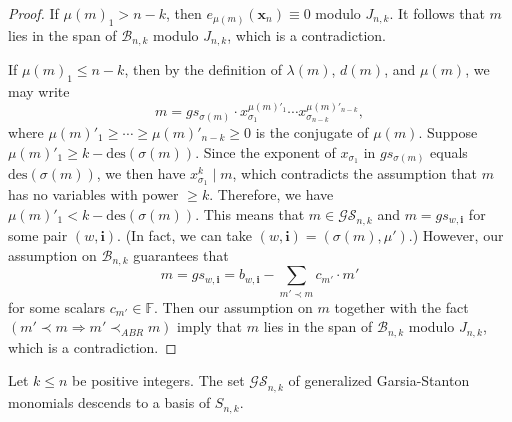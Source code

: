 \documentclass[ALCO,ThmDefs,published]{cedram}
\newcommand{\symm}{{\mathfrak{S}}}
\newcommand{\xx}{{\mathbf {x}}}
\newcommand{\FF}{{\mathbb{F}}}
\theoremstyle{plain}
\newcommand{\des}{{\mathrm {des}}}
\newcommand{\symm}{{\mathfrak{S}}}
\newcommand{\FF}{{\mathbb{F}}}
\newcommand{\CCC}{{\mathcal{C}}}
\newcommand{\BBB}{{\mathcal{B}}}
\newcommand{\GS}{{\mathcal{GS}}}
\newcommand{\xx}{{\mathbf {x}}}
\newcommand{\ii}{{\mathbf{i}}}
\newcommand{\edit}[1]{{\color{red}{\bf {#1}}}}
\begin{document}
\begin{proof}
If $\mu(m)_1 > n-k$, then $e_{\mu(m)}(\xx_n) \equiv 0$ modulo $J_{n,k}$.  It follows that $m$ lies in the 
span of $\BBB_{n,k}$ modulo $J_{n,k}$, which is a contradiction.

If $\mu(m)_1 \leq n-k$, then by the definition of $\lambda(m)$, $d(m)$, and $\mu(m)$, we may write
\begin{equation}
m = gs_{\sigma(m)} \cdot x_{\sigma_1}^{\mu(m)'_1} \cdots x_{\sigma_{n-k}}^{\mu(m)'_{n-k}},
\end{equation}
where $\mu(m)'_1 \geq \cdots \geq \mu(m)'_{n-k} \geq 0$ is the conjugate of $\mu(m)$.  
Suppose $\mu(m)'_1 \geq k - \des(\sigma(m))$.  
Since the exponent of $x_{\sigma_1}$ in $gs_{\sigma(m)}$ equals $\des(\sigma(m))$,
we then have $x_{\sigma_1}^k \mid m$, which contradicts the assumption that $m$ has no variables with power
$\geq k$.  
Therefore, we have $\mu(m)'_1 < k - \des(\sigma(m))$.  This means that $m \in \GS_{n,k}$ and $m = gs_{w,\ii}$ for 
some pair $(w,\ii)$.
(In fact, we can take $(w,\ii)=(\sigma(m),\mu')$.)  However, our assumption on $\BBB_{n,k}$ guarantees that 
\begin{equation}
m = gs_{w,\ii} = b_{w,\ii} - \sum_{m' \prec m} c_{m'} \cdot m'
\end{equation}
for some scalars $c_{m'} \in \FF$.  
Then our assumption on $m$ together with the fact $(m' \prec m \Rightarrow m' \prec_{ABR} m)$ imply that 
$m$ lies in the span of $\BBB_{n,k}$ modulo $J_{n,k}$, which is a contradiction.
\end{proof}


\begin{corollary}
\label{garsia-stanton-basis}
Let $k \leq n$ be positive integers.  The set $\GS_{n,k}$ of generalized Garsia-Stanton monomials
descends to a basis of $S_{n,k}$.
\end{corollary}

\end{document}
